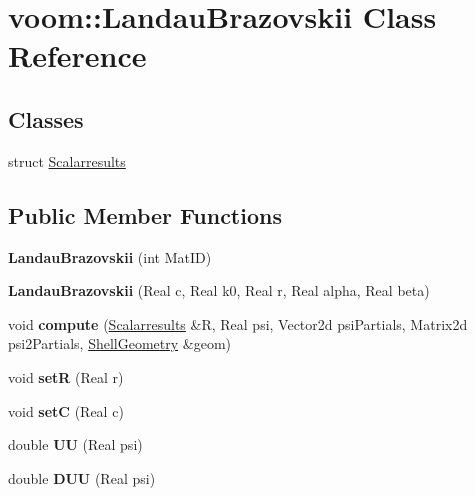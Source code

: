 \hypertarget{classvoom_1_1_landau_brazovskii}{
\section{voom::LandauBrazovskii Class Reference}
\label{classvoom_1_1_landau_brazovskii}
}
\subsection*{Classes}
\begin{DoxyCompactItemize}
\item 
struct \hyperlink{structvoom_1_1_landau_brazovskii_1_1_scalarresults}{Scalarresults}
\end{DoxyCompactItemize}
\subsection*{Public Member Functions}
\begin{DoxyCompactItemize}
\item 
\hypertarget{classvoom_1_1_landau_brazovskii_acd3e90f90cad990c6dfe13f68d491259}{
{\bfseries LandauBrazovskii} (int MatID)}
\label{classvoom_1_1_landau_brazovskii_acd3e90f90cad990c6dfe13f68d491259}

\item 
\hypertarget{classvoom_1_1_landau_brazovskii_a057dc0304b64f247de0a5e39e054587e}{
{\bfseries LandauBrazovskii} (Real c, Real k0, Real r, Real alpha, Real beta)}
\label{classvoom_1_1_landau_brazovskii_a057dc0304b64f247de0a5e39e054587e}

\item 
\hypertarget{classvoom_1_1_landau_brazovskii_addb9d526bed4a6df02e78d3701cc8530}{
void {\bfseries compute} (\hyperlink{structvoom_1_1_landau_brazovskii_1_1_scalarresults}{Scalarresults} \&R, Real psi, Vector2d psiPartials, Matrix2d psi2Partials, \hyperlink{classvoom_1_1_shell_geometry}{ShellGeometry} \&geom)}
\label{classvoom_1_1_landau_brazovskii_addb9d526bed4a6df02e78d3701cc8530}

\item 
\hypertarget{classvoom_1_1_landau_brazovskii_a09d6f37f94bcfa8a84e977a92c3a1aef}{
void {\bfseries setR} (Real r)}
\label{classvoom_1_1_landau_brazovskii_a09d6f37f94bcfa8a84e977a92c3a1aef}

\item 
\hypertarget{classvoom_1_1_landau_brazovskii_aabc2a5b65161fa78b01965cc1aaed1ba}{
void {\bfseries setC} (Real c)}
\label{classvoom_1_1_landau_brazovskii_aabc2a5b65161fa78b01965cc1aaed1ba}

\item 
\hypertarget{classvoom_1_1_landau_brazovskii_aa5c95b1e5463e353b4402bb95e5179ea}{
double {\bfseries UU} (Real psi)}
\label{classvoom_1_1_landau_brazovskii_aa5c95b1e5463e353b4402bb95e5179ea}

\item 
\hypertarget{classvoom_1_1_landau_brazovskii_a3a36d3422ad3e49b12e5eeaf24ddde27}{
double {\bfseries DUU} (Real psi)}
\label{classvoom_1_1_landau_brazovskii_a3a36d3422ad3e49b12e5eeaf24ddde27}

\end{DoxyCompactItemize}

